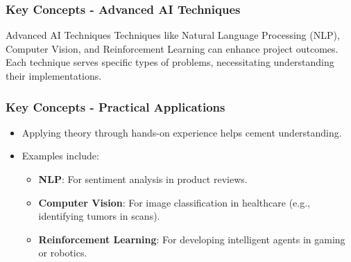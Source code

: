\documentclass[aspectratio=169]{beamer}
\begin{document}
\begin{frame}
  \frametitle{Key Concepts - Advanced AI Techniques}
  \begin{block}{Advanced AI Techniques}
    Techniques like Natural Language Processing (NLP), Computer Vision, and Reinforcement Learning can enhance project outcomes. Each technique serves specific types of problems, necessitating understanding their implementations.
  \end{block}
\end{frame}

\begin{frame}
  \frametitle{Key Concepts - Practical Applications}
  \begin{itemize}
    \item Applying theory through hands-on experience helps cement understanding.
    \item Examples include:
      \begin{itemize}
        \item \textbf{NLP}: For sentiment analysis in product reviews.
        \item \textbf{Computer Vision}: For image classification in healthcare (e.g., identifying tumors in scans).
        \item \textbf{Reinforcement Learning}: For developing intelligent agents in gaming or robotics.
      \end{itemize}
  \end{itemize}
\end{frame}
\end{document}
